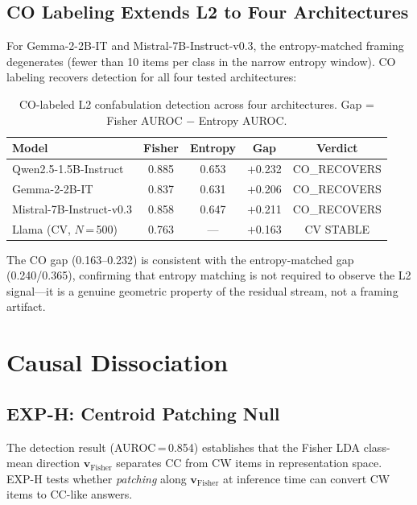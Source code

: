 \documentclass[11pt,twocolumn]{article}
\newcommand{\vect}[1]{\mathbf{#1}}
\begin{document}
\subsection{CO Labeling Extends L2 to Four Architectures}

For Gemma-2-2B-IT and Mistral-7B-Instruct-v0.3, the entropy-matched framing
degenerates (fewer than 10 items per class in the narrow entropy window). CO labeling
recovers detection for all four tested architectures:

\begin{table}[h]
\centering
\caption{CO-labeled L2 confabulation detection across four architectures.
  Gap = Fisher AUROC $-$ Entropy AUROC.}
\begin{tabular}{lcccc}
\toprule
Model & Fisher & Entropy & Gap & Verdict \\
\midrule
Qwen2.5-1.5B-Instruct   & 0.885 & 0.653 & $+$0.232 & CO\_RECOVERS \\
Gemma-2-2B-IT           & 0.837 & 0.631 & $+$0.206 & CO\_RECOVERS \\
Mistral-7B-Instruct-v0.3 & 0.858 & 0.647 & $+$0.211 & CO\_RECOVERS \\
Llama (CV, $N$\,=\,500) & 0.763 & ---   & $+$0.163 & CV STABLE \\
\bottomrule
\end{tabular}
\end{table}

The CO gap (0.163--0.232) is consistent with the entropy-matched gap (0.240/0.365),
confirming that entropy matching is not required to observe the L2 signal---it is a
genuine geometric property of the residual stream, not a framing artifact.

\section{Causal Dissociation}

\subsection{EXP-H: Centroid Patching Null}

The detection result (AUROC\,=\,0.854) establishes that the Fisher LDA class-mean
direction $\vect{v}_\text{Fisher}$ separates CC from CW items in representation space.
EXP-H tests whether \emph{patching} along $\vect{v}_\text{Fisher}$ at inference time
can convert CW items to CC-like answers.
\end{document}
